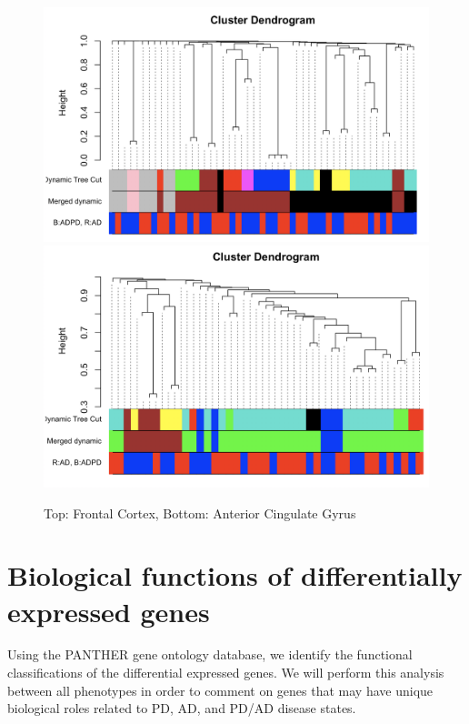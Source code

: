\begin{figure}
    \centering
    \includegraphics[width=\textwidth]{./Figures/WGCNA/add_dendro_FC.png}
    \includegraphics[width=\textwidth]{./Figures/WGCNA/add_dendro_ACG.png}
    \caption{Top: Frontal Cortex, Bottom: Anterior Cingulate Gyrus}
    \label{Fig: Dendrograms}
\end{figure}




\section{Biological functions of differentially expressed genes}
\label{sec:biol-funct-diff}

Using the PANTHER gene ontology database, we identify the functional classifications of the differential expressed genes. We will perform this analysis between all phenotypes in order to comment on genes that may have unique biological roles related to PD, AD, and PD/AD disease states.



